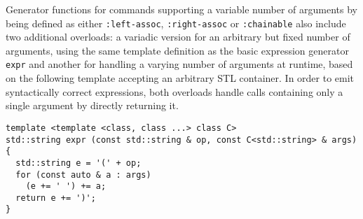 \noindent
Generator functions for \SMTLIB{} commands supporting a variable number of arguments by being defined as either \lstinline[language=smtlib]{:left-assoc}, \lstinline[language=smtlib]{:right-assoc} or \lstinline[language=smtlib]{:chainable} %
also include two additional overloads:
a variadic version for an arbitrary but fixed number of arguments, using the same template definition as the basic expression generator \lstinline[style=c++]{expr}
and another for handling a varying number of arguments at runtime, based on the following template accepting an arbitrary STL container.
In order to emit syntactically correct \SMTLIB{} expressions, both overloads handle calls containing only a single argument by directly returning it.



\newpage

\begin{lstlisting}[style=c++]
template <template <class, class ...> class C>
std::string expr (const std::string & op, const C<std::string> & args)
{
  std::string e = '(' + op;
  for (const auto & a : args)
    (e += ' ') += a;
  return e += ')';
}
\end{lstlisting}

